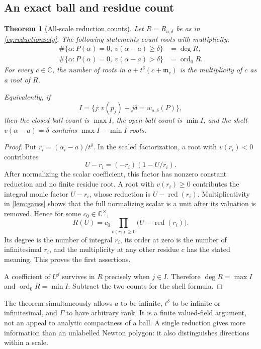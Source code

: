 \documentclass[11pt,letterpaper]{article}
\numberwithin{equation}{section}
\newtheorem{theorem}{Theorem}[section]
\theoremstyle{definition}
\theoremstyle{remark}
\newcommand{\C}{\mathbb C}
\newcommand{\mv}{\mathfrak m_v}
\newcommand{\red}{\operatorname{red}}
\newcommand{\ord}{\operatorname{ord}}
\begin{document}
\subsection{An exact ball and residue count}
\begin{theorem}[All-scale reduction counts]\label{thm:reductioncount}
Let $R=R_{a,\delta}$ be as in \eqref{eq:reductionpoly}. The following
statements count roots with multiplicity:
\begin{align}
 \#\{\alpha:P(\alpha)=0,\ v(\alpha-a)\ge\delta\}&=\deg R,
                                                        \label{eq:closedcount}\\
 \#\{\alpha:P(\alpha)=0,\ v(\alpha-a)>\delta\}&=\ord_0R.
                                                        \label{eq:opencount}
\end{align}
For every $c\in\C$, the number of roots in
$a+t^\delta(c+\mv)$ is the multiplicity of $c$ as a root of $R$.

Equivalently, if
\[
 I=\{j:v(p_j)+j\delta=w_{a,\delta}(P)\},
\]
then the closed-ball count is $\max I$, the open-ball count is $\min I$,
and the shell $v(\alpha-a)=\delta$ contains $\max I-\min I$ roots.
\end{theorem}
\begin{proof}
Put $r_i=(\alpha_i-a)/t^\delta$. In the scaled factorization, a root with
$v(r_i)<0$ contributes
\[
 U-r_i=(-r_i)(1-U/r_i).
\]
After normalizing the scalar coefficient, this factor has nonzero constant
reduction and no finite residue root. A root with $v(r_i)\ge0$ contributes
the integral monic factor $U-r_i$, whose reduction is
$U-\red(r_i)$. Multiplicativity in \cref{lem:gauss} shows that the full
normalizing scalar is a unit after its valuation is removed. Hence for
some $c_0\in\C^\times$,
\begin{equation}\label{eq:reducedfactorization}
 R(U)=c_0\prod_{v(r_i)\ge0}\bigl(U-\red(r_i)\bigr).
\end{equation}
Its degree is the number of integral $r_i$, its order at zero is the
number of infinitesimal $r_i$, and the multiplicity at any other residue
$c$ has the stated meaning. This proves the first assertions.

A coefficient of $U^j$ survives in $R$ precisely when $j\in I$.
Therefore $\deg R=\max I$ and $\ord_0R=\min I$. Subtract the two counts
for the shell formula.
\end{proof}

The theorem simultaneously allows $a$ to be infinite, $t^\delta$ to be
infinite or infinitesimal, and $\Gamma$ to have arbitrary rank. It is a
finite valued-field argument, not an appeal to analytic compactness of a
ball. A single reduction gives more information than an unlabelled
Newton polygon: it also distinguishes directions within a scale.
\end{document}
